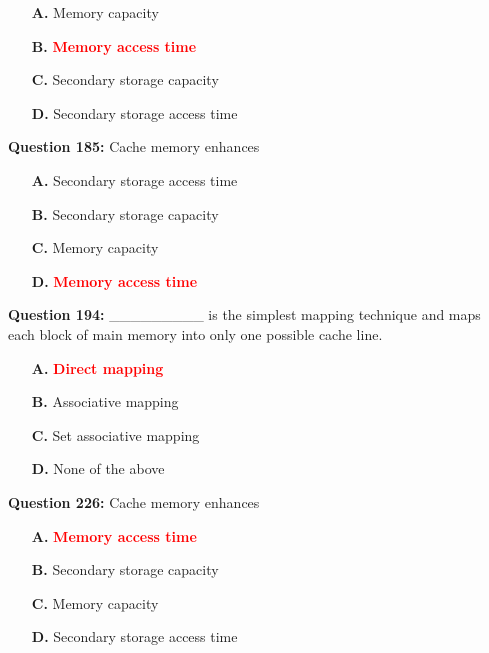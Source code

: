 \documentclass[12pt,a4paper]{article}
\begin{document}
\begin{itemize}
    \item[\textbf{A.}] Memory capacity
    \item[\textbf{B.}] \textcolor{red}{\textbf{Memory access time}}
    \item[\textbf{C.}] Secondary storage capacity
    \item[\textbf{D.}] Secondary storage access time
\end{itemize}

\vspace{0.5cm}

\textbf{Question 185:} Cache memory enhances

\begin{itemize}
    \item[\textbf{A.}] Secondary storage access time
    \item[\textbf{B.}] Secondary storage capacity
    \item[\textbf{C.}] Memory capacity
    \item[\textbf{D.}] \textcolor{red}{\textbf{Memory access time}}
\end{itemize}

\vspace{0.5cm}

\textbf{Question 194:} _________ is the simplest mapping technique and maps each block of main memory into only one possible cache line.

\begin{itemize}
    \item[\textbf{A.}] \textcolor{red}{\textbf{Direct mapping}}
    \item[\textbf{B.}] Associative mapping
    \item[\textbf{C.}] Set associative mapping
    \item[\textbf{D.}] None of the above
\end{itemize}

\vspace{0.5cm}

\textbf{Question 226:} Cache memory enhances

\begin{itemize}
    \item[\textbf{A.}] \textcolor{red}{\textbf{Memory access time}}
    \item[\textbf{B.}] Secondary storage capacity
    \item[\textbf{C.}] Memory capacity
    \item[\textbf{D.}] Secondary storage access time
\end{itemize}
\end{document}
